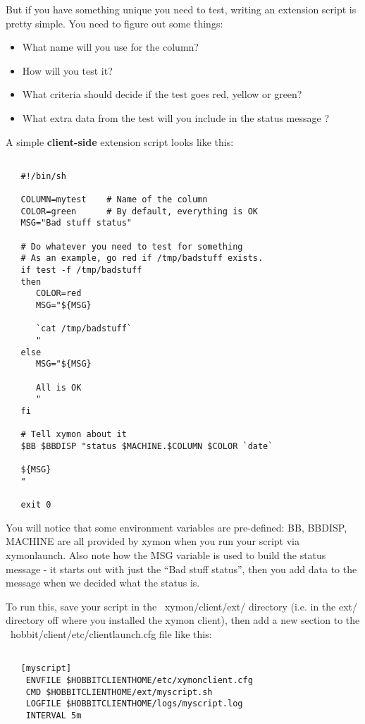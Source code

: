  But if you have something unique you need to test, writing an extension script is pretty simple. You need to figure out some things:
\begin{itemize}
\item What name will you use for the column? 
\item How will you test it? 
\item What criteria should decide if the test goes red, yellow or green? 
\item What extra data from the test will you include in the status message ? 

\end{itemize}


 A simple \textbf{client-side}
 extension script looks like this:
\begin{verbatim}

   #!/bin/sh

   COLUMN=mytest	# Name of the column
   COLOR=green		# By default, everything is OK
   MSG="Bad stuff status"

   # Do whatever you need to test for something
   # As an example, go red if /tmp/badstuff exists.
   if test -f /tmp/badstuff
   then
      COLOR=red
      MSG="${MSG}
 
      `cat /tmp/badstuff`
      "
   else
      MSG="${MSG}

      All is OK
      "
   fi

   # Tell xymon about it
   $BB $BBDISP "status $MACHINE.$COLUMN $COLOR `date`

   ${MSG}
   "

   exit 0

\end{verbatim}


 You will notice that some environment variables are pre-defined: BB, BBDISP, MACHINE are all provided by xymon when you run your script via xymonlaunch. Also note how the MSG variable is used to build the status message - it starts out with just the ``Bad stuff status'', then you add data to the message when we decided what the status is.


 To run this, save your script in the ~xymon/client/ext/ directory (i.e. in the ext/ directory off where you installed the xymon client), then add a new section to the ~hobbit/client/etc/clientlaunch.cfg file like this:
\begin{verbatim}

   [myscript]
	ENVFILE $HOBBITCLIENTHOME/etc/xymonclient.cfg
	CMD $HOBBITCLIENTHOME/ext/myscript.sh
	LOGFILE $HOBBITCLIENTHOME/logs/myscript.log
	INTERVAL 5m

\end{verbatim}
 
